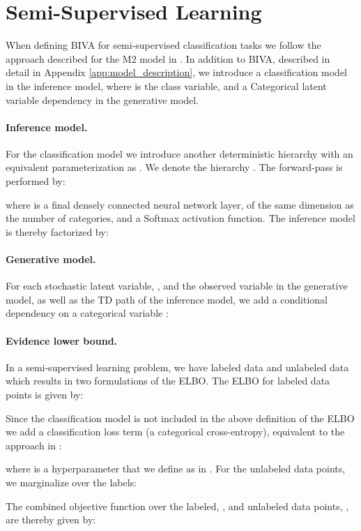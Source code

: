 \documentclass{article}
\def\nm{BIVA\xspace}
\begin{document}
\section{Semi-Supervised Learning}\label{app:semi_supervised}
When defining \nm for semi-supervised classification tasks we follow the approach described for the M2 model in \citep{Kingma14}. In addition to \nm, described in detail in Appendix \ref{app:model_description}, we introduce a classification model  in the inference model, where  is the class variable, and a Categorical latent variable dependency in the generative model.

\paragraph{Inference model.} For the classification model we introduce another deterministic hierarchy with an equivalent parameterization as . We denote the hierarchy . The forward-pass is performed by:

where  is a final densely connected neural network layer, of the same dimension as the number of categories, and a Softmax activation function. The inference model is thereby factorized by:


\paragraph{Generative model.} For each stochastic latent variable, , and the observed variable  in the generative model, as well as the TD path of the inference model, we add a conditional dependency on a categorical variable :


\paragraph{Evidence lower bound.} In a semi-supervised learning problem, we have labeled data and unlabeled data which results in two formulations of the ELBO. The ELBO for labeled data points is given by:

Since the classification model is not included in the above definition of the ELBO we add a classification loss term (a categorical cross-entropy), equivalent to the approach in \citep{Kingma14}:

where  is a hyperparameter that we define as in \citep{Maaloe2016}. For the unlabeled data points, we marginalize over the labels:

The combined objective function over the labeled, , and unlabeled data points, , are thereby given by:
\end{document}
